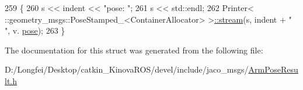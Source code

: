 \begin{DoxyCode}
259   \{
260     s << indent << \textcolor{stringliteral}{"pose: "};
261     s << std::endl;
262     Printer< ::geometry\_msgs::PoseStamped\_<ContainerAllocator> >\hyperlink{structros_1_1message__operations_1_1Printer_3_01_1_1jaco__msgs_1_1ArmPoseResult___3_01ContainerAllocator_01_4_01_4_a08d2cf33c3794771e37d1aa3ce2f7abc}{::stream}(s, indent + \textcolor{stringliteral}{"  "}, v.
      \hyperlink{structjaco__msgs_1_1ArmPoseResult___a35fabbce17a2d3c3c0e9bcd97985053b}{pose});
263   \}
\end{DoxyCode}


The documentation for this struct was generated from the following file\+:\begin{DoxyCompactItemize}
\item 
D\+:/\+Longfei/\+Desktop/catkin\+\_\+\+Kinova\+R\+O\+S/devel/include/jaco\+\_\+msgs/\hyperlink{ArmPoseResult_8h}{Arm\+Pose\+Result.\+h}\end{DoxyCompactItemize}
